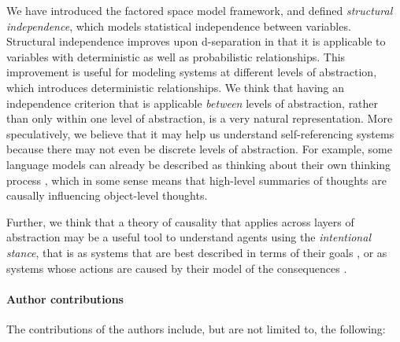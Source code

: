 \documentclass[USenglish,onecolumn]{article}
\begin{document}
We have introduced the factored space model framework, and defined \emph{structural independence}, which models statistical independence between variables. 
Structural independence improves upon d-separation in that it is applicable to variables with deterministic as well as probabilistic relationships. 
This improvement is useful for modeling systems at different levels of abstraction, which introduces deterministic relationships. 
We think that having an independence criterion that is applicable \textit{between} levels of abstraction, rather than only within one level of abstraction, is a very natural representation. More speculatively, we believe that it may help us understand self-referencing systems because there may not even be discrete levels of abstraction. For example, some language models can already be described as thinking about their own thinking process \cite{kadavath2022language} \cite{didolkar2024metacognitive}, which in some sense means that high-level summaries of thoughts are causally influencing object-level thoughts.

Further, we think that a theory of causality that applies across layers of abstraction may be a useful tool to understand agents using the \emph{intentional stance}, that is as systems that are best described in terms of their goals \cite{dennett1989intentional}, or as systems whose actions are caused by their model of the consequences \cite{kenton2023discovering}  \cite{everitt2021agent}.


\paragraph*{Author contributions}

The contributions of the authors include, but are not limited to, the following: 
\end{document}
